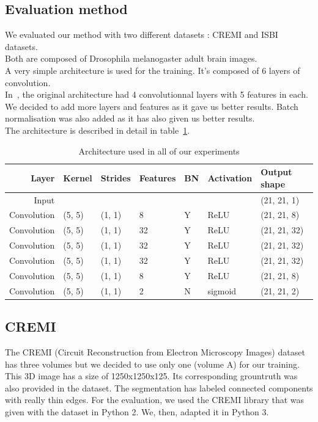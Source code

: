\subsection{Evaluation method}
We evaluated our method with two different datasets : CREMI and ISBI datasets.\\
Both are composed of Drosophila melanogaster adult brain images.\\

A very simple architecture is used for the training.
It's composed of 6 layers of convolution.\\
In~\cite{turaga_maximin_2009}, the original architecture had 4 convolutionnal
layers with 5 features in each. We decided to add more layers and features as
it gave us better results. 
Batch normalisation was also added as it has also given us better results.\\

The architecture is described in detail in table~\ref{tab:archi}.

\begin{table}[!htbp]
	\centering
	\begin{tabular}{rllllll}\toprule
		Layer & Kernel & Strides & Features & BN &  Activation & Output shape \\
		\midrule
		Input  &  &  & & & & (21, 21, 1)  \\
		Convolution & (5, 5) & (1, 1) & 8 & Y & ReLU  & (21, 21, 8)  \\
		Convolution & (5, 5) & (1, 1) & 32 & Y & ReLU  & (21, 21, 32)  \\
		Convolution & (5, 5) & (1, 1) & 32 & Y & ReLU  & (21, 21, 32)  \\
		Convolution & (5, 5) & (1, 1) & 32 & Y & ReLU  & (21, 21, 32)  \\
		Convolution & (5, 5) & (1, 1) & 8 & Y & ReLU  & (21, 21, 8)  \\
		Convolution & (5, 5) & (1, 1) & 2 & N & sigmoid  & (21, 21, 2)  \\
		\bottomrule
	\end{tabular}
	\caption{Architecture used in all of our experiments}
	\label{tab:archi}
\end{table}



\subsection{CREMI}
The CREMI (Circuit Reconstruction from Electron Microscopy Images) dataset has three volumes but we decided to use only one (volume A) for our training.\\
This 3D image has a size of 1250x1250x125. Its corresponding grountruth was also provided in the dataset. 
The segmentation has labeled connected components with really thin edges.
For the evaluation, we used the CREMI library that was given with the dataset in Python 2. We, then, adapted it in Python 3.\\

